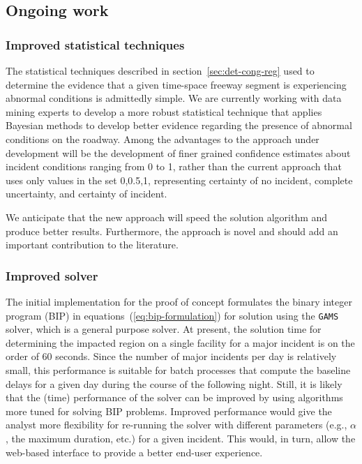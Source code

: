 \documentclass[12pt]{report}
\begin{document}
\subsection{Ongoing work}
\label{sec:ongoing-work-incident-impact}

\subsubsection{Improved statistical techniques}
\label{sec:improved-stats}

The statistical techniques described in section~\ref{sec:det-cong-reg}
used to determine the evidence that a given time-space freeway segment
is experiencing abnormal conditions is admittedly simple.  We are
currently working with data mining experts to develop a more robust
statistical technique that applies Bayesian methods to develop better
evidence regarding the presence of abnormal conditions on the roadway.
Among the advantages to the approach under development will be the
development of finer grained confidence estimates about incident
conditions ranging from 0 to 1, rather than the current approach that
uses only values in the set {0,0.5,1}, representing certainty of no
incident, complete uncertainty, and certainty of incident.  

We anticipate that the new approach will speed the solution algorithm
and produce better results.  Furthermore, the approach is novel and
should add an important contribution to the literature.


\subsubsection{Improved solver}
\label{sec:improved-solver}

The initial implementation for the proof of concept formulates the
binary integer program (BIP) in equations~(\ref{eq:bip-formulation})
for solution using the \texttt{GAMS} solver, which is a general
purpose solver.  At present, the solution time for determining the
impacted region on a single facility for a major incident is on the
order of 60 seconds.  Since the number of major incidents per day is
relatively small, this performance is suitable for batch processes
that compute the baseline delays for a given day during the course of
the following night.  Still, it is likely that the (time) performance
of the solver can be improved by using algorithms more tuned for
solving BIP problems.  Improved performance would give the analyst
more flexibility for re-running the solver with different parameters
(e.g., $\alpha$, the maximum duration, etc.) for a given incident.
This would, in turn, allow the web-based interface to provide a better
end-user experience.
\end{document}
